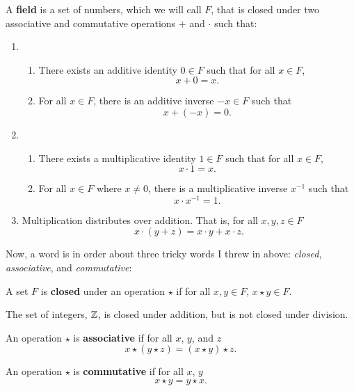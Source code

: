 \begin{definition} A \textbf{field} is a set of numbers, which we will call $F$, that is closed under two associative and commutative operations $+$ and $\cdot$ such that:
\begin{enumerate}
\item 
\begin{enumerate} 
\item There exists an additive identity $0\in F$ such that for all $x\in F$, 
\[
x+0=x.
\]
\item For all $x\in F$, there is an additive inverse $-x\in F$ such that 
\[
x+ (-x) =0.
\]
\end{enumerate}
\item \begin{enumerate}
\item There exists a multiplicative identity $1\in F$ such that for all $x\in F$, 
\[
x\cdot 1 =x.
\]
\item For all $x\in F$ where $x\ne  0$, there is a multiplicative inverse $x^{-1}$  such that 
\[
x\cdot x^{-1}= 1.
\]
\end{enumerate}
\item Multiplication distributes over addition. That is, for all $x,y,z\in F$
\[
x\cdot (y+z)=x\cdot y+x\cdot z.
\]
\end{enumerate}
\end{definition}

Now, a word is in order about three tricky words I threw in above: \textit{closed}, \textit{associative}, and \textit{commutative}: 

\begin{definition} A set $F$ is \textbf{closed} under an operation $\star$ if for all $x,y\in F$, $x\star y\in F$.   
\end{definition}

\begin{example} The set of integers, $\mathbb Z$, is closed under addition, but is not closed under division.
\end{example}

\begin{definition} An operation $\star$ is \textbf{associative} if for all $x$, $y$, and $z$
\[
x\star(y \star z) = (x \star y) \star z.
\]   
\end{definition}

\begin{definition} An operation $\star$ is \textbf{commutative} if for all $x$, $y$
\[
x\star y  =  y \star x.
\]   
\end{definition}


